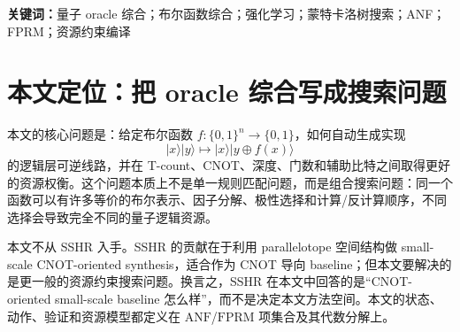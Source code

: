 \documentclass[UTF8,fontset=macnew,11pt]{ctexart}
\newcommand{\method}{Resource-NMCTS}
\newcommand{\anf}{\ensuremath{\mathrm{ANF}}}
\newcommand{\fprm}{\ensuremath{\mathrm{FPRM}}}
\newcommand{\xor}{\ensuremath{\oplus}}
\newcommand{\rz}{\ensuremath{R_z}}
\begin{document}
\begin{abstract}
本文同时报告 gate-set 边界。RevKit Python \texttt{oracle\_synth} 在 177 个函数上全部返回，但 171/177 行含非 Clifford \rz{}，总数为 9242，因此其 lower-bound phase netlist 不能直接当作精确 Clifford+T T-count 对比。为把该边界推进到项目内部，本文实现 phase-parity \anf{} emitter：将每个 \anf{} 单项式精确展开为 parity-phase gadgets，177/177 个函数均验证为 phase oracle up to global phase。该 emitter 相对 RevKit lower-bound score 为 40/137/0、平均高 69.25\%，但在每个非 Clifford \rz{} 加 1 个 score 单位后转为 177/0/0、平均降低 48.16\%，在 $T/R_z=30$ 近似旋转综合 proxy 下为 177/0/0、平均降低 64.98\%。进一步地，本文新增 fixed-polarity phase-parity search：对每个函数枚举 \fprm{} 极性 $p$，综合 $g(z)=f(z\xor p)$ 的 phase polynomial，再把 shifted parity 精确翻译回原变量。三个 rank metric 共 531 行全部验证通过；其中 $T/R_z=30$ 目标在 59/177 个函数选择非零极性，相对原始 phase-parity \anf{} 为 59/0/118、平均 score 降低 0.47\%，相对 RevKit $T/R_z=30$ proxy 为 177/0/0、平均降低 65.16\%。这说明 \fprm{} 极性已经把 phase/Rz 方向变成实际搜索问题，但收益仍小，不能把它写成最终 phase 方法。阶段性结论是：\method{} 已经形成一条独立于 SSHR、以低 T-count 与低加权逻辑资源为目标的 Boolean oracle synthesis 主线；当前缺口是更强的学习式 phase/Rz-aware search、官方 ROS 或 legacy RevKit/CirKit 完整复现，以及真实后端 mapping 评估。
\end{abstract}

\noindent\textbf{关键词：}量子 oracle 综合；布尔函数综合；强化学习；蒙特卡洛树搜索；ANF；FPRM；资源约束编译

\section{本文定位：把 oracle 综合写成搜索问题}

本文的核心问题是：给定布尔函数 $f:\{0,1\}^n\rightarrow\{0,1\}$，如何自动生成实现
\begin{equation}
  |x\rangle |y\rangle \mapsto |x\rangle |y\xor f(x)\rangle
  \label{eq:oracle}
\end{equation}
的逻辑层可逆线路，并在 T-count、CNOT、深度、门数和辅助比特之间取得更好的资源权衡。这个问题本质上不是单一规则匹配问题，而是组合搜索问题：同一个函数可以有许多等价的布尔表示、因子分解、极性选择和计算/反计算顺序，不同选择会导致完全不同的量子逻辑资源。

本文不从 SSHR 入手。SSHR 的贡献在于利用 parallelotope 空间结构做 small-scale CNOT-oriented synthesis\cite{zheng2025sshr}，适合作为 CNOT 导向 baseline；但本文要解决的是更一般的资源约束搜索问题。换言之，SSHR 在本文中回答的是“CNOT-oriented small-scale baseline 怎么样”，而不是决定本文方法空间。本文的状态、动作、验证和资源模型都定义在 \anf{}/\fprm{} 项集合及其代数分解上。
\end{document}
